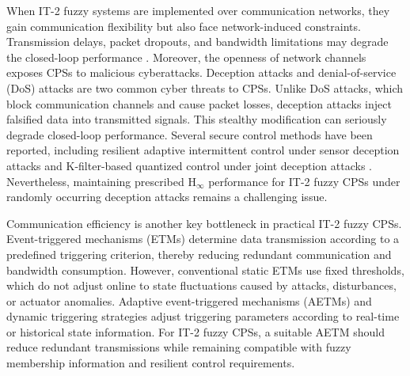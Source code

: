 \documentclass[preprint,review,fleqn,sort&compress,3p]{elsarticle}
\theoremstyle{definition} %
\theoremstyle{definition}%
\begin{document}
When IT-2 fuzzy systems are implemented over communication networks, they gain communication flexibility but also face network-induced constraints. Transmission delays, packet dropouts, and bandwidth limitations may
degrade the closed-loop performance \cite{zhangNetworkedControlSystems2020,pangNetworkedPredictiveControl2026}.
Moreover, the openness of network channels exposes CPSs to malicious cyberattacks.
Deception attacks
\cite{yaoSecureControlMarkovian2023c,lianSwitchingLikeEventTriggeredControl2021}
and denial-of-service (DoS) attacks
\cite{zhaDynamicEventTriggeredOutput2022, buEventTriggeredDataDrivenControl2023}
are two common cyber threats to CPSs. Unlike DoS attacks, which block communication
channels and cause packet losses, deception attacks inject falsified data into
transmitted signals. This stealthy modification can seriously degrade closed-loop
performance. Several secure control methods have been
reported, including resilient adaptive intermittent control under sensor deception
attacks \cite{wangResilientAdaptiveIntermittent2024} and K-filter-based quantized
control under joint deception attacks \cite{wangResilientAdaptiveStabilization2025}.
Nevertheless, maintaining prescribed $\mathrm{H}_\infty$ performance for IT-2 fuzzy
CPSs under randomly occurring deception attacks remains a challenging issue.

Communication efficiency is another key bottleneck in practical IT-2 fuzzy CPSs.
Event-triggered mechanisms (ETMs)
\cite{postoyanFrameworkEventTriggeredStabilization2015,chenFinitetimeStabilityNonlinear2026}
determine data transmission according to a predefined triggering criterion, thereby reducing redundant communication and bandwidth consumption.
However, conventional static ETMs use fixed thresholds, which do not adjust online to state fluctuations caused by attacks, disturbances, or actuator anomalies. Adaptive event-triggered mechanisms (AETMs)
\cite{xingSwitchedFuzzyControl2024,duFaultTolerantHInfinityStabilization2025}
and dynamic triggering strategies \cite{tanDynamicMemoryEventTriggeredSlidingMode2025}
adjust triggering parameters according to real-time or historical state
information. For IT-2 fuzzy CPSs, a suitable AETM should reduce redundant
transmissions while remaining compatible with fuzzy membership information and
resilient control requirements.
\end{document}
